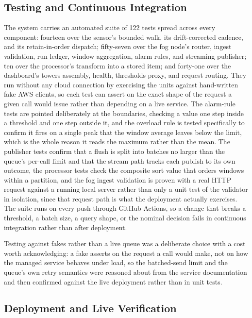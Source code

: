 \documentclass[conference]{IEEEtran}
\begin{document}
\subsection{Testing and Continuous Integration}

The system carries an automated suite of 122 tests spread across every component: fourteen over the sensor's bounded walk, its drift-corrected cadence, and its retain-in-order dispatch; fifty-seven over the fog node's router, ingest validation, run ledger, window aggregation, alarm rules, and streaming publisher; ten over the processor's transform into a stored item; and forty-one over the dashboard's towers assembly, health, thresholds proxy, and request routing. They run without any cloud connection by exercising the units against hand-written fake AWS clients, so each test can assert on the exact shape of the request a given call would issue rather than depending on a live service. The alarm-rule tests are pointed deliberately at the boundaries, checking a value one step inside a threshold and one step outside it, and the overload rule is tested specifically to confirm it fires on a single peak that the window average leaves below the limit, which is the whole reason it reads the maximum rather than the mean. The publisher tests confirm that a flush is split into batches no larger than the queue's per-call limit and that the stream path tracks each publish to its own outcome, the processor tests check the composite sort value that orders windows within a partition, and the fog ingest validation is proven with a real HTTP request against a running local server rather than only a unit test of the validator in isolation, since that request path is what the deployment actually exercises. The suite runs on every push through GitHub Actions, so a change that breaks a threshold, a batch size, a query shape, or the nominal decision fails in continuous integration rather than after deployment.

Testing against fakes rather than a live queue was a deliberate choice with a cost worth acknowledging: a fake asserts on the request a call would make, not on how the managed service behaves under load, so the batched-send limit and the queue's own retry semantics were reasoned about from the service documentation \cite{awssqs} and then confirmed against the live deployment rather than in unit tests.

\subsection{Deployment and Live Verification}
\end{document}
